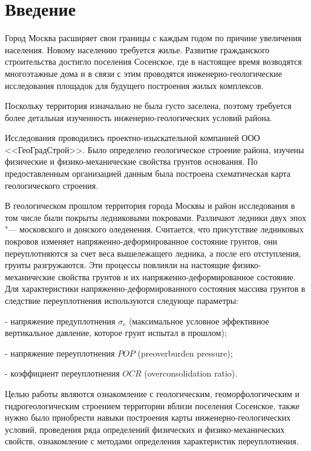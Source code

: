 \chapter*{Введение}                         %

Город Москва расширяет свои границы с каждым годом по причине увеличения населения. 
Новому населению требуется жилье. Развитие гражданского строительства достигло поселения 
Сосенское, где в настоящее время возводятся многоэтажные дома и в связи с этим проводятся 
инженерно-геологические исследования площадок для будущего построения жилых комплексов.

Поскольку территория изначально не была густо заселена, поэтому требуется более детальная 
изученность инженерно-геологических условий района.

Исследования проводились проектно-изыскательной компанией ООО <<ГеоГрадСтрой>>. 
Было определено геологическое строение района, изучены физические и физико-механические свойства грунтов основания. 
По предоставленным организацией данным была построена схематическая карта геологического строения.

В геологическом прошлом территория города Москвы и район исследования в том числе были 
покрыты ледниковыми покровами. Различают ледники двух эпох "--- московского и донского оледенения. 
Считается, что присутствие ледниковых покровов изменяет напряженно-деформированное состояние 
грунтов, они переуплотняются за счет веса вышележащего ледника, а после его отступления, 
грунты разгружаются. Эти процессы повлияли на настоящие физико-механические свойства грунтов 
и их напряженно-деформированное состояние. Для характеристики напряженно-деформированного 
состояния массива грунтов в следствие переуплотнения используются следующе параметры:

- напряжение предуплотнения $\sigma_c$ (максимальное условное эффективное вертикальное давление, 
которое грунт испытал в прошлом);

- напряжение переуплотнения $POP$ (preoverburden pressure);

- коэффициент переуплотнения $OCR$ (overconsolidation ratio).

Целью работы являются ознакомление с геологическим, геоморфологическим и 
гидрогеологическим строением территории вблизи поселения Сосенское, также 
нужно было приобрести навыки построения карты инженерно-геологических 
условий, проведения ряда определений физических и физико-механических 
свойств, ознакомление с методами определения характеристик переуплотнения.

